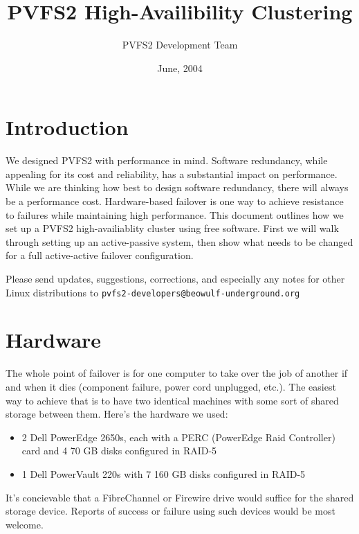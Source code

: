 \documentclass[11pt]{article}
\title{PVFS2 High-Availibility Clustering}
\author{PVFS2 Development Team}
\date{June, 2004}
\begin{document}
\maketitle


\section{Introduction}
We designed PVFS2 with performance in mind.  Software redundancy, while
appealing for its cost and reliability, has a substantial impact on
performance.  While we are thinking how best to design software
redundancy, there will always be a performance cost.  Hardware-based
failover is one way to achieve resistance to failures while maintaining
high performance.  This document outlines how we set up a PVFS2
high-availiablity cluster using free software.  First we will walk
through setting up an active-passive system, then show what needs to be
changed for a full active-active failover configuration.

Please send updates, suggestions, corrections, and especially any
notes for other Linux distributions to
\texttt{pvfs2-developers@beowulf-underground.org}

\section{Hardware}

The whole point of failover is for one computer to take over the job of
another if and when it dies (component failure, power cord unplugged,
etc.).   The easiest way to achieve that is to have two
identical machines with some sort of shared storage between them.
Here's the hardware we used:

\begin{itemize}
\item 2 Dell PowerEdge 2650s, 
	each with a PERC (PowerEdge Raid Controller) card
	and 4 70 GB disks configured in RAID-5
\item 1 Dell PowerVault 220s
	with 7 160 GB disks configured in RAID-5
\end{itemize}

It's concievable that a FibreChannel or Firewire drive would suffice for
the shared storage device.  Reports of success or failure using such
devices would be most welcome.
\end{document}
